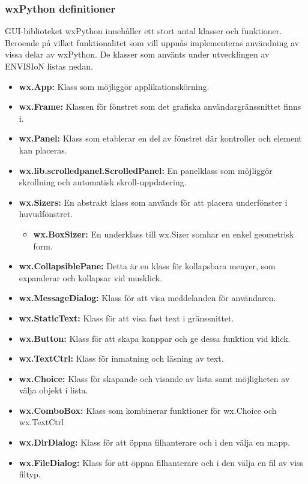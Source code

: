 \subsubsection{wxPython definitioner}
GUI-biblioteket wxPython innehåller ett stort antal klasser och funktioner. Beroende på vilket funktionalitet som vill uppnås implementeras användning av vissa delar av wxPython. De klasser som använts under utvecklingen av ENVISIoN listas nedan\cite{wxPythonDoc}.
\begin{itemize}
    \setlength\itemsep{0em}
    \item \textbf{wx.App: } Klass som möjliggör applikationskörning.
    \item \textbf{wx.Frame: }Klassen för fönstret som det grafiska användargränssnittet finns i.
    \item \textbf{wx.Panel: }Klass som etablerar en del av fönstret där kontroller och element kan placeras.
    \item \textbf{ wx.lib.scrolledpanel.ScrolledPanel: }En panelklass som möjliggör skrollning och automatisk skroll-uppdatering.
    \item \textbf{wx.Sizers: }En abstrakt klass som används för att placera underfönster i huvudfönstret.
    \begin{itemize}
        \item \textbf{wx.BoxSizer: }En underklass till wx.Sizer somhar en enkel geometrisk form.
    \end{itemize}
    \item \textbf{wx.CollapsiblePane: }Detta är en klass för kollapsbara menyer, som expanderar och kollapsar vid musklick.
    \item \textbf{wx.MessageDialog: }Klass för att visa meddelanden för användaren.
    \item \textbf{wx.StaticText: }Klass för att visa fast text i gränssnittet.
    \item \textbf{wx.Button: }Klass för att skapa kanppar och ge dessa funktion vid klick.
    \item \textbf{wx.TextCtrl: }Klass för inmatning och läsning av text.
    \item \textbf{wx.Choice: }Klass för skapande och visande av lista samt möjligheten av välja objekt i lista.
    \item \textbf{wx.ComboBox: }Klass som kombinerar funktioner för wx.Choice och wx.TextCtrl
    \item \textbf{wx.DirDialog: }Klass för att öppna filhanterare och i den välja en mapp.
    \item \textbf{wx.FileDialog: }Klass för att öppna filhanterare och i den välja en fil av viss filtyp.

\end{itemize}
